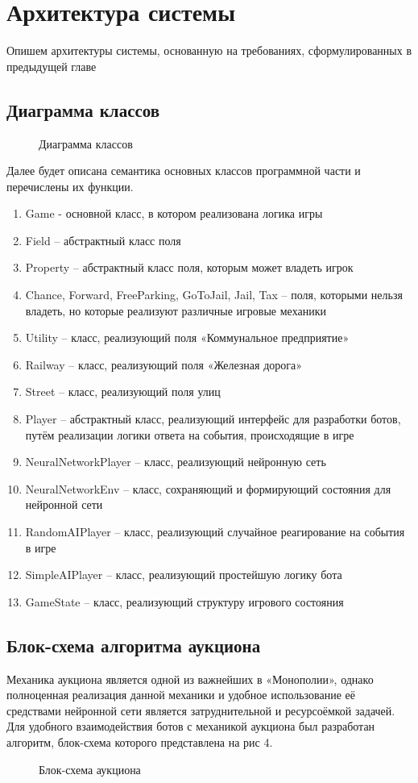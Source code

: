 \newpage
\section{Архитектура системы}
Опишем архитектуры системы, основанную на требованиях, сформулированных в предыдущей главе
\subsection{Диаграмма классов}
\begin{figure}[h]
    \caption{Диаграмма классов}
\end{figure}
Далее будет описана семантика основных классов программной части и перечислены их функции.
\begin{spacing}{0.9}
\begin{enumerate}
    \item Game - основной класс, в котором реализована логика игры
    \item Field – абстрактный класс поля
    \item Property – абстрактный класс поля, которым может владеть игрок
    \item Chance, Forward, FreeParking, GoToJail, Jail, Tax – поля, которыми нельзя владеть, но которые реализуют различные игровые механики
    \item Utility – класс, реализующий поля «Коммунальное предприятие»
    \item Railway – класс, реализующий поля «Железная дорога»
    \item Street – класс, реализующий поля улиц
    \item Player – абстрактный класс, реализующий интерфейс для разработки ботов, путём реализации логики ответа на события, происходящие в игре
    \item NeuralNetworkPlayer – класс, реализующий нейронную сеть
    \item NeuralNetworkEnv – класс, сохраняющий и формирующий состояния для нейронной сети
    \item RandomAIPlayer – класс, реализующий случайное реагирование на события в игре
    \item SimpleAIPlayer – класс, реализующий простейшую логику бота
    \item GameState – класс, реализующий структуру игрового состояния
\end{enumerate}
\end{spacing}
\subsection{Блок-схема алгоритма аукциона}
Механика аукциона является одной из важнейших в «Монополии», однако полноценная реализация данной механики и удобное использование её средствами нейронной сети является затруднительной и ресурсоёмкой задачей. Для удобного взаимодействия ботов с механикой аукциона был разработан алгоритм, блок-схема которого представлена на рис 4.
\begin{figure}[h!]
    \caption{Блок-схема аукциона}
\end{figure}
\newpage
